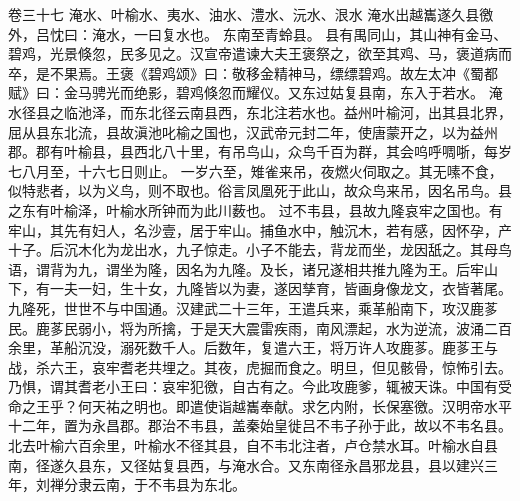 \documentclass[12pt,UTF8]{ctexbook}
\begin{document}
卷三十七  淹水、叶榆水、夷水、油水、澧水、沅水、泿水 
淹水出越巂遂久县徼外，吕忱曰：淹水，一曰复水也。
东南至青蛉县。
县有禺同山，其山神有金马、碧鸡，光景倏忽，民多见之。汉宣帝遣谏大夫王褒祭之，欲至其鸡、马，褒道病而卒，是不果焉。王褒《碧鸡颂》曰：敬移金精神马，缥缥碧鸡。故左太冲《蜀都赋》曰：金马骋光而绝影，碧鸡倏忽而耀仪。又东过姑复县南，东入于若水。
淹水径县之临池泽，而东北径云南县西，东北注若水也。益州叶榆河，出其县北界，屈从县东北流，县故滇池叱榆之国也，汉武帝元封二年，使唐蒙开之，以为益州郡。郡有叶榆县，县西北八十里，有吊鸟山，众鸟千百为群，其会呜呼啁哳，每岁七八月至，十六七日则止。
一岁六至，雉雀来吊，夜燃火伺取之。其无嗉不食，似特悲者，以为义鸟，则不取也。俗言凤凰死于此山，故众鸟来吊，因名吊鸟。县之东有叶榆泽，叶榆水所钟而为此川薮也。
过不韦县，县故九隆哀牢之国也。有牢山，其先有妇人，名沙壹，居于牢山。捕鱼水中，触沉木，若有感，因怀孕，产十子。后沉木化为龙出水，九子惊走。小子不能去，背龙而坐，龙因舐之。其母鸟语，谓背为九，谓坐为隆，因名为九隆。及长，诸兄遂相共推九隆为王。后牢山下，有一夫一妇，生十女，九隆皆以为妻，遂因孳育，皆画身像龙文，衣皆著尾。九隆死，世世不与中国通。汉建武二十三年，王遣兵来，乘革船南下，攻汉鹿茤民。鹿茤民弱小，将为所擒，于是天大震雷疾雨，南风漂起，水为逆流，波涌二百余里，革船沉没，溺死数千人。后数年，复遣六王，将万许人攻鹿茤。鹿茤王与战，杀六王，哀牢耆老共埋之。其夜，虎掘而食之。明旦，但见骸骨，惊怖引去。乃惧，谓其耆老小王曰：哀牢犯徼，自古有之。今此攻鹿爹，辄被天诛。中国有受命之王乎？何天祐之明也。即遣使诣越巂奉献。求乞内附，长保塞徼。汉明帝水平十二年，置为永昌郡。郡治不韦县，盖秦始皇徙吕不韦子孙于此，故以不韦名县。北去叶榆六百余里，叶榆水不径其县，自不韦北注者，卢仓禁水耳。叶榆水自县南，径遂久县东，又径姑复县西，与淹水合。又东南径永昌邪龙县，县以建兴三年，刘禅分隶云南，于不韦县为东北。
\end{document}
